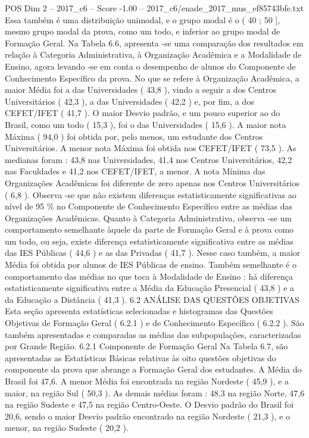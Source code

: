 \begin{textsample}{POS Dim 2 – 2017\_c6 – Score -1.00 – 2017\_c6/enade\_2017\_mus\_ef85743bfe.txt}
Essa também é uma distribuição unimodal, e o grupo modal é o ( 40 ; 50 ], mesmo grupo modal da prova, como um todo, e inferior ao grupo modal de Formação Geral.
Na Tabela 6.6, apresenta -se uma comparação dos resultados em relação à Categoria Administrativa, à Organização Acadêmica e a Modalidade de Ensino, agora levando -se em conta o desempenho de alunos do Componente de Conhecimento Específico da prova.
No que se refere à Organização Acadêmica, a maior Média foi a das Universidades ( 43,8 ), vindo a seguir a dos Centros Universitários ( 42,3 ), a das Universidades ( 42,2 ) e, por fim, a dos CEFET/IFET ( 41,7 ).
O maior Desvio padrão, e um pouco superior ao do Brasil, como um todo ( 15,3 ), foi o das Universidades ( 15,6 ).
A maior nota Máxima ( 94,0 ) foi obtida por, pelo menos, um estudante dos Centros Universitários.
A menor nota Máxima foi obtida nos CEFET/IFET ( 73,5 ).
As medianas foram : 43,8 nas Universidades, 41,4 nos Centros Universitários, 42,2 nas Faculdades e 41,2 nos CEFET/IFET, a menor.
A nota Mínima das Organizações Acadêmicas foi diferente de zero apenas nos Centros Universitários ( 6,8 ).
Observa -se que não existem diferenças estatisticamente significativas ao nível de 95 \% no Componente de Conhecimento Específico entre as médias das Organizações Acadêmicas.
Quanto à Categoria Administrativa, observa -se um comportamento semelhante àquele da parte de Formação Geral e à prova como um todo, ou seja, existe diferença estatisticamente significativa entre as médias das IES Públicas ( 44,6 ) e as das Privadas ( 41,7 ).
Nesse caso também, a maior Média foi obtida por alunos de IES Públicas de ensino.
Também semelhante é o comportamento das médias no que toca à Modalidade de Ensino : há diferença estatisticamente significativa entre a Média da Educação Presencial ( 43,8 ) e a da Educação a Distância ( 41,3 ). 6.2 ANÁLISE DAS QUESTÕES OBJETIVAS Esta seção apresenta estatísticas selecionadas e histogramas das Questões Objetivas de Formação Geral ( 6.2.1 ) e de Conhecimento Específico ( 6.2.2 ).
São também apresentadas e comparadas as médias das subpopulações, caracterizadas por Grande Região. 6.2.1 Componente de Formação Geral Na Tabela 6.7, são apresentadas as Estatísticas Básicas relativas às oito questões objetivas do componente da prova que abrange a Formação Geral dos estudantes.
A Média do Brasil foi 47,6.
A menor Média foi encontrada na região Nordeste ( 45,9 ), e a maior, na região Sul ( 50,3 ).
As demais médias foram : 48,3 na região Norte, 47,6 na região Sudeste e 47,5 na região Centro-Oeste.
O Desvio padrão do Brasil foi 20,6, sendo o maior Desvio padrão encontrado na região Nordeste ( 21,3 ), e o menor, na região Sudeste ( 20,2 ).

\end{textsample}
